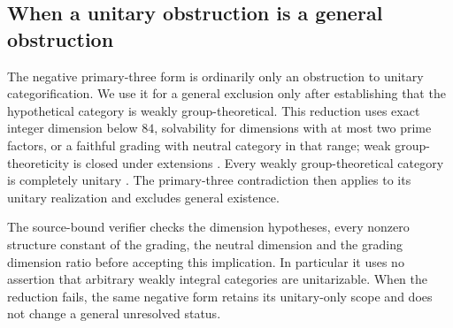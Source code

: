 \subsection{When a unitary obstruction is a general obstruction}
The negative primary-three form is ordinarily only an obstruction to
unitary categorification. We use it for a general exclusion only after
establishing that the hypothetical category is weakly group-theoretical.
This reduction uses exact integer dimension below $84$, solvability for
dimensions with at most two prime factors, or a faithful grading with
neutral category in that range; weak group-theoreticity is closed under
extensions \cite[Proposition~4.1 and the small-dimension theorems]{ENOSolvable}.
Every weakly group-theoretical category is completely unitary
\cite[Theorem~5.20]{GHR}. The primary-three contradiction then applies to
its unitary realization and excludes general existence.

The source-bound verifier checks the dimension hypotheses, every nonzero
structure constant of the grading, the neutral dimension and the grading
dimension ratio before accepting this implication. In particular it uses
no assertion that arbitrary weakly integral categories are unitarizable.
When the reduction fails, the same negative form retains its unitary-only
scope and does not change a general unresolved status.
